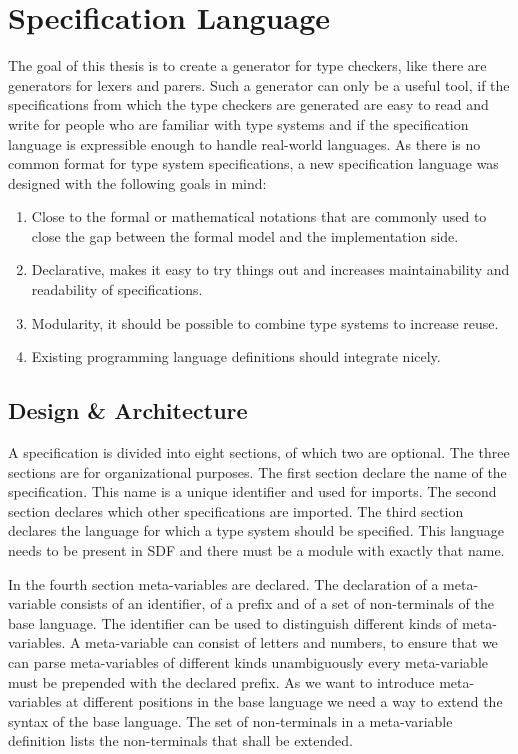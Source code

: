 
\chapter{Specification Language}
The goal of this thesis is to create a generator for type checkers,
like there are generators for lexers and parers. Such a generator can
only be a useful tool, if the specifications from which the type
checkers are generated are easy to read and write for people who are
familiar with type systems and if the specification language is
expressible enough to handle real-world languages. As there is no
common format for type system specifications, a new specification
language was designed with the following goals in mind:

\begin{enumerate}
\item Close to the formal or mathematical notations that are commonly
  used to close the gap between the formal model and the
  implementation side.
\item Declarative, makes it easy to try things out and increases
  maintainability and readability of specifications.
\item Modularity, it should be possible to combine type systems to
  increase reuse.
\item Existing programming language definitions should integrate nicely.
\end{enumerate}
\section{Design \& Architecture}
A specification is divided into eight sections, of which two are
optional. The three sections are for organizational purposes. The
first section declare the name of the specification. This name is a
unique identifier and used for imports. The second section declares
which other specifications are imported. The third section declares
the language for which a type system should be specified. This
language needs to be present in SDF and there must be a module with
exactly that name. 

In the fourth section meta-variables are declared. The declaration of
a meta-variable consists of an identifier, of a prefix and of a set of
non-terminals of the base language. The identifier can be used to
distinguish different kinds of meta-variables. A meta-variable can consist of letters and numbers, to
ensure that we can parse meta-variables of different kinds
unambiguously every meta-variable must be prepended with the declared
prefix. As we want to introduce meta-variables at different positions
in the base language we need a way to extend the syntax of the base
language. The set of non-terminals in a meta-variable definition lists
the non-terminals that shall be extended.


